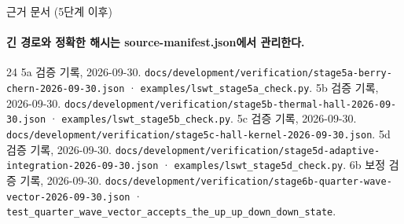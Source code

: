 \begin{frame}[label=sources-stage5]{근거 문서 (5단계 이후)}
  \framesubtitle{긴 경로와 정확한 해시는 source-manifest.json에서 관리한다.}
  \small
  \begin{thebibliography}{24}
    \setcounter{enumiv}{20}
      5a 검증 기록, 2026-09-30.
      \newblock \texttt{docs/development/verification/stage5a-berry-chern-2026-09-30.json} · \texttt{examples/lswt\_stage5a\_check.py}.
      5b 검증 기록, 2026-09-30.
      \newblock \texttt{docs/development/verification/stage5b-thermal-hall-2026-09-30.json} · \texttt{examples/lswt\_stage5b\_check.py}.
      5c 검증 기록, 2026-09-30.
      \newblock \texttt{docs/development/verification/stage5c-hall-kernel-2026-09-30.json}.
      5d 검증 기록, 2026-09-30.
      \newblock \texttt{docs/development/verification/stage5d-adaptive-integration-2026-09-30.json} · \texttt{examples/lswt\_stage5d\_check.py}.
      6b 보정 검증 기록, 2026-09-30.
      \newblock \texttt{docs/development/verification/stage6b-quarter-wave-vector-2026-09-30.json} · \texttt{test\_quarter\_wave\_vector\_accepts\_the\_up\_up\_down\_down\_state}.
  \end{thebibliography}
\end{frame}
